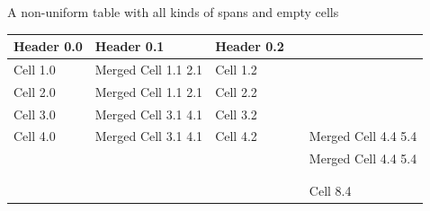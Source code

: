 \documentclass[11pt,a4paper]{article}
\begin{document}
A non-uniform table with all kinds of spans and empty cells

\begin{table}[h]
\begin{tabular}{|l|l|l|l|l|}
\hline
Header 0.0 & Header 0.1 & Header 0.2 &  &  \\ \hline
Cell 1.0 & Merged Cell 1.1 2.1 & Cell 1.2 &  &  \\ \hline
Cell 2.0 & Merged Cell 1.1 2.1 & Cell 2.2 &  &  \\ \hline
Cell 3.0 & Merged Cell 3.1 4.1 & Cell 3.2 &  &  \\ \hline
Cell 4.0 & Merged Cell 3.1 4.1 & Cell 4.2 &  & Merged Cell 4.4 5.4 \\ \hline
 &  &  &  & Merged Cell 4.4 5.4 \\ \hline
 &  &  &  &  \\ \hline
 &  &  &  &  \\ \hline
 &  &  &  & Cell 8.4 \\ \hline
\end{tabular}
\end{table}
\end{document}
